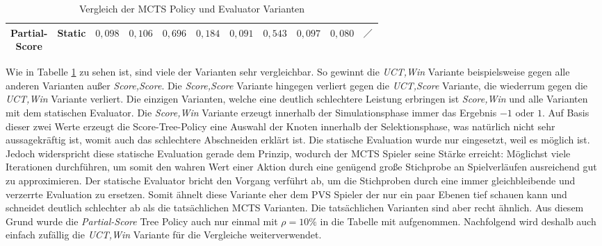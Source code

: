 \begin{table}[H]
{\begin{tabular}{|c|c|c|c|c|c|c|c|c|c|c|}
            \tiny \makecell{Partial-                                                                                                                                                                                                                                                                                                                                                              \\Score} &        Static & \cellcolor[HTML]{f9826f}$0{,}098$ & \cellcolor[HTML]{f98470}$0{,}106$ & \cellcolor[HTML]{c2da81}$0{,}696$ & \cellcolor[HTML]{fa9874}$0{,}184$ & \cellcolor[HTML]{f9806f}$0{,}091$ & \cellcolor[HTML]{f2e884}$0{,}543$ & \cellcolor[HTML]{f9826f}$0{,}097$ & \cellcolor[HTML]{f97d6e}$0{,}080$ & $\diagup$                         \\ \hline
        \end{tabular}}
    \vspace{3pt}
    \caption{Vergleich der \acs{MCTS} Policy und Evaluator Varianten}
    \label{tabelle:mcts-policy-eval-comparision}
\end{table}

Wie in Tabelle \ref{tabelle:mcts-policy-eval-comparision} zu sehen ist, sind viele der Varianten sehr vergleichbar. So gewinnt die \emph{\acs{UCT},Win} Variante beispielsweise gegen alle anderen Varianten außer \emph{Score,Score}. Die \emph{Score,Score} Variante hingegen verliert gegen die \emph{\acs{UCT},Score} Variante, die wiederrum gegen die \emph{\acs{UCT},Win} Variante verliert. Die einzigen Varianten, welche eine deutlich schlechtere Leistung erbringen ist \emph{Score,Win} und alle Varianten mit dem statischen Evaluator. Die \emph{Score,Win} Variante erzeugt innerhalb der Simulationsphase immer das Ergebnis $-1$ oder $1$. Auf Basis dieser zwei Werte erzeugt die Score-Tree-Policy eine Auswahl der Knoten innerhalb der Selektionsphase, was natürlich nicht sehr aussagekräftig ist, womit auch das schlechtere Abschneiden erklärt ist. Die statische Evaluation wurde nur eingesetzt, weil es möglich ist. Jedoch widerspricht diese statische Evaluation gerade dem Prinzip, wodurch der \ac{MCTS} Spieler seine Stärke erreicht: Möglichst viele Iterationen durchführen, um somit den wahren Wert einer Aktion durch eine genügend große Stichprobe an Spielverläufen ausreichend gut zu approximieren. Der statische Evaluator bricht den Vorgang verführt ab, um die Stichproben durch eine immer gleichbleibende und verzerrte Evaluation zu ersetzen. Somit ähnelt diese Variante eher dem \ac{PVS} Spieler der nur ein paar Ebenen tief schauen kann und schneidet deutlich schlechter ab als die tatsächlichen \ac{MCTS} Varianten. Die tatsächlichen Varianten sind aber recht ähnlich. Aus diesem Grund wurde die \emph{Partial-Score} Tree Policy auch nur einmal mit $\rho = 10\%$ in die Tabelle mit aufgenommen. Nachfolgend wird deshalb auch einfach zufällig die \emph{\acs{UCT},Win} Variante für die Vergleiche weiterverwendet.

